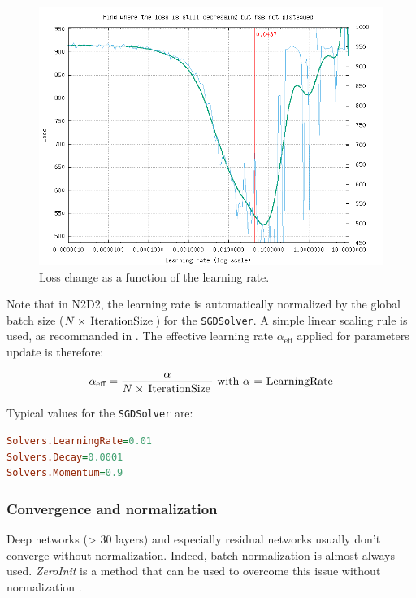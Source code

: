 \documentclass[a4paper,11pt,oneside]{article}
\begin{document}
\begin{figure}[H]
  \centering
  \includegraphics[width=0.8\linewidth]{figs/find_lr.png}
  \caption{Loss change as a function of the learning rate.}
  \label{fig:findLr}
\end{figure}

Note that in N2D2, the learning rate is automatically normalized by the global batch size ($N \times \text{\lstinline!IterationSize!}$) for the \lstinline!SGDSolver!. A simple linear scaling rule is used, as recommanded in \citep{DBLP:journals/corr/GoyalDGNWKTJH17}. The effective learning rate $\alpha_{\text{eff}}$ applied for parameters update is therefore:

\[ \alpha_{\text{eff}} = \frac{\alpha}{N \times \text{\lstinline!IterationSize!}} \text{ with $\alpha$ = \lstinline!LearningRate!} \]


Typical values for the \lstinline!SGDSolver! are:

\begin{lstlisting}[language=ini]
Solvers.LearningRate=0.01
Solvers.Decay=0.0001
Solvers.Momentum=0.9
\end{lstlisting}


\subsubsection{Convergence and normalization}

Deep networks (> 30 layers) and especially residual networks usually don't converge without normalization. Indeed, batch normalization is almost always used.
\emph{ZeroInit} is a method that can be used to overcome this issue without normalization \citep{zhang2018residual}.
\end{document}
